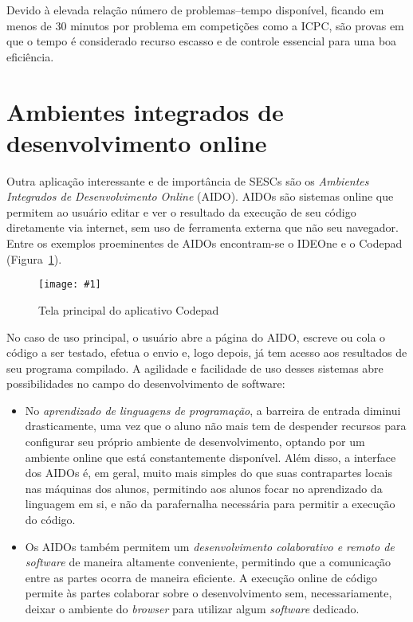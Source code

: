 \documentclass[ruledheader, 12pt]{abnt}
\newcommand{\figcustom}[4]{\par
	\begin{figure}[#3]
		\centering
		\texttt{[image: \#1]}
		\caption{\label{fig:#1}#2}
	\end{figure}
\par}
\newcommand{\fig}[2]{\figcustom{#1}{#2}{bp}{1}}
\newcommand{\figref}[1]{(Figura~\ref{fig:#1})}
\begin{document}
Devido à elevada relação número de problemas--tempo disponível, ficando em menos de 30 minutos por problema em competições como a ICPC, são provas em que o tempo é considerado recurso escasso e de controle essencial para uma boa eficiência.

\section{Ambientes integrados de desenvolvimento online}


Outra aplicação interessante e de importância de SESCs são os \emph{Ambientes Integrados de Desenvolvimento Online} (AIDO). AIDOs são sistemas online que permitem ao usuário editar e ver o resultado da execução de seu código diretamente via internet, sem uso de ferramenta externa que não seu navegador. Entre os exemplos proeminentes de AIDOs encontram-se o IDEOne \cite{ideoneabout} e o Codepad \cite{codepadabout} \figref{codepad}.

\fig{codepad}{Tela principal do aplicativo Codepad}

No caso de uso principal, o usuário abre a página do AIDO, escreve ou cola o código a ser testado, efetua o envio e, logo depois, já tem acesso aos resultados de seu programa compilado. A agilidade e facilidade de uso desses sistemas abre possibilidades no campo do desenvolvimento de software:
\begin{itemize}
	\item No \emph{aprendizado de linguagens de programação}, a barreira de entrada diminui drasticamente, uma vez que o aluno não mais tem de despender recursos para configurar seu próprio ambiente de desenvolvimento, optando por um ambiente online que está constantemente disponível. Além disso, a interface dos AIDOs é, em geral, muito mais simples do que suas contrapartes locais nas máquinas dos alunos, permitindo aos alunos focar no aprendizado da linguagem em si, e não da parafernalha necessária para permitir a execução do código.
	
	\item Os AIDOs também permitem um \emph{desenvolvimento colaborativo e remoto de software} de maneira altamente conveniente, permitindo que a comunicação entre as partes ocorra de maneira eficiente. A execução online de código permite às partes colaborar sobre o desenvolvimento sem, necessariamente, deixar o ambiente do \emph{browser} para utilizar algum \emph{software} dedicado.
\end{itemize}
\end{document}
